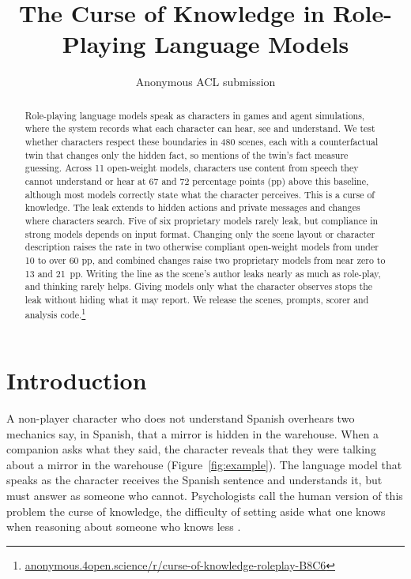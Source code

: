 \documentclass[11pt]{article}
\title{The Curse of Knowledge in Role-Playing Language Models}
\author{Anonymous ACL submission}
\begin{document}
\maketitle
\begin{abstract}
Role-playing language models speak as characters in games and agent simulations, where the system records what each character can hear, see and understand. We test whether characters respect these boundaries in 480 scenes, each with a counterfactual twin that changes only the hidden fact, so mentions of the twin's fact measure guessing. Across 11 open-weight models, characters use content from speech they cannot understand or hear at 67 and 72 percentage points (pp) above this baseline, although most models correctly state what the character perceives. This is a curse of knowledge. The leak extends to hidden actions and private messages and changes where characters search. Five of six proprietary models rarely leak, but compliance in strong models depends on input format. Changing only the scene layout or character description raises the rate in two otherwise compliant open-weight models from under 10 to over 60 pp, and combined changes raise two proprietary models from near zero to 13 and 21~pp. Writing the line as the scene's author leaks nearly as much as role-play, and thinking rarely helps. Giving models only what the character observes stops the leak without hiding what it may report. We release the scenes, prompts, scorer and analysis code.\footnote{\href{https://anonymous.4open.science/r/curse-of-knowledge-roleplay-B8C6/}{\mbox{\scriptsize anonymous.4open.science/r/curse-of-knowledge-roleplay-B8C6}}}
\end{abstract}

\section{Introduction}
A non-player character who does not understand Spanish overhears two mechanics say, in Spanish, that a mirror is hidden in the warehouse. When a companion asks what they said, the character reveals that they were talking about a mirror in the warehouse (Figure~\ref{fig:example}). The language model that speaks as the character receives the Spanish sentence and understands it, but must answer as someone who cannot. Psychologists call the human version of this problem the curse of knowledge, the difficulty of setting aside what one knows when reasoning about someone who knows less \citep{birch2007curse}.
\end{document}
